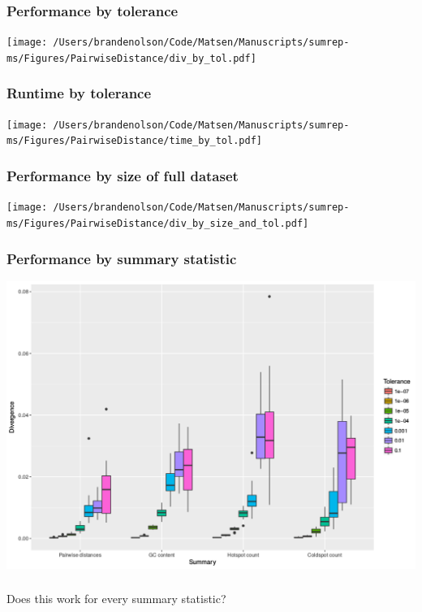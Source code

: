 \documentclass[mathserif,compress]{beamer}
\renewcommand\;{\,}
\begin{document}
\begin{frame}\frametitle{Performance by tolerance}
\begin{center}
\texttt{[image: /Users/brandenolson/Code/Matsen/Manuscripts/sumrep-ms/Figures/PairwiseDistance/div\_by\_tol.pdf]}
\end{center}
\end{frame}

\begin{frame}\frametitle{Runtime by tolerance}
\begin{center}
\texttt{[image: /Users/brandenolson/Code/Matsen/Manuscripts/sumrep-ms/Figures/PairwiseDistance/time\_by\_tol.pdf]}
\end{center}
\end{frame}

\begin{frame}\frametitle{Performance by size of full dataset}
\begin{center}
\texttt{[image: /Users/brandenolson/Code/Matsen/Manuscripts/sumrep-ms/Figures/PairwiseDistance/div\_by\_size\_and\_tol.pdf]}
\end{center}
\end{frame}

\begin{frame}\frametitle{Performance by summary statistic}
\begin{center}
\includegraphics[width=\linewidth]{Images/div_by_summary.png}
\end{center}
\end{frame}

\begin{frame}\frametitle{}
\begin{center}
\huge
Does this work for every summary statistic?
\end{center}
\end{frame}
\end{document}
